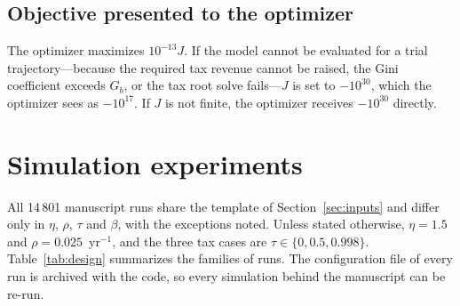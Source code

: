 \documentclass[11pt]{article}
\begin{document}
\subsection{Objective presented to the optimizer}
\label{sec:nlopt}

The optimizer maximizes $10^{-13}J$. If the model cannot be evaluated for a
trial trajectory---because the required tax revenue cannot be raised, the
Gini coefficient exceeds $G_b$, or the tax root solve fails---$J$ is set to
$-10^{30}$, which the optimizer sees as $-10^{17}$. If $J$ is not finite, the
optimizer receives $-10^{30}$ directly.

\section{Simulation experiments}
\label{sec:design}

All 14\,801 manuscript runs share the template of
Section~\ref{sec:inputs} and differ only in $\eta$, $\rho$, $\tau$ and $\beta$,
with the exceptions noted. Unless stated otherwise, $\eta = 1.5$ and
$\rho = 0.025$~yr$^{-1}$, and the three tax cases are
$\tau\in\{0, 0.5, 0.998\}$. Table~\ref{tab:design} summarizes the families of
runs. The configuration file of every run is archived with the code, so every
simulation behind the manuscript can be re-run.
\end{document}
